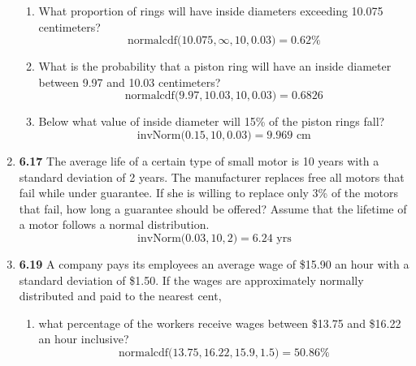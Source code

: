 \documentclass[basic, header]{nosvagor-notes}
\begin{document}
\begin{enumerate}[itemsep=4em]
\begin{enumerate}
      \item What proportion of rings will have inside diameters exceeding
        10.075 centimeters?
        \[%
          \text{normalcdf($10.075,\infty,10,0.03$)} = \boxed{0.62\%}
        \]%

      \item What is the probability that a piston ring will have an inside
        diameter between 9.97 and 10.03 centimeters?
        \[%
          \text{normalcdf($9.97,10.03,10,0.03$)} = \boxed{0.6826}
        \]%

      \item Below what value of inside diameter will 15\% of the piston rings
        fall?
        \[%
          \text{invNorm($0.15,10,0.03$)} = \boxed{9.969 \text{ cm}}
        \]%

    \end{enumerate}

  \newpage %

  \item \textbf{6.17} The average life of a certain type of small motor is 10 years with
    a standard deviation of 2 years. The manufacturer replaces free all motors
    that fail while under guarantee. If she is willing to replace only 3\% of
    the motors that fail, how long a guarantee should be offered? Assume that
    the lifetime of a motor follows a normal distribution.
    \[%
          \text{invNorm($0.03,10,2$)} = \boxed{6.24 \text{ yrs}}
    \]%

  \item \textbf{6.19} A company pays its employees an average wage of \$15.90 an hour
    with a standard deviation of \$1.50. If the wages are approximately normally
    distributed and paid to the nearest cent,
    \begin{enumerate}

      \item what percentage of the workers receive wages between \$13.75 and \$16.22 an hour inclusive?
        \[%
          \text{normalcdf($13.75,16.22,15.9,1.5$)} = \boxed{50.86\%}
        \]%


\end{enumerate}
\end{enumerate}
\end{document}
